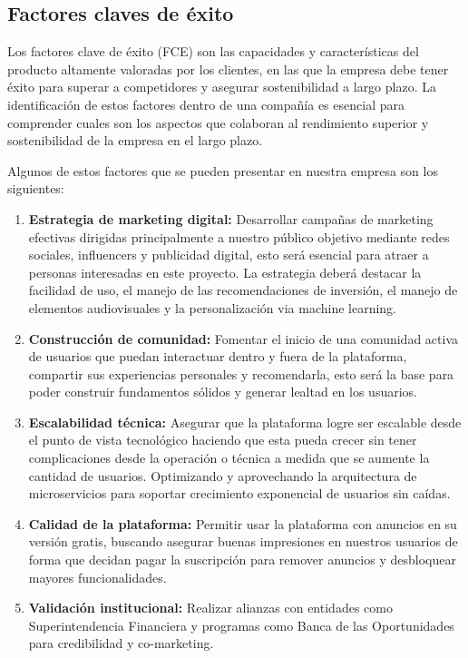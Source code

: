 \subsection*{Factores claves de éxito}

Los factores clave de éxito (FCE) son las capacidades y características del producto altamente valoradas por los clientes, en las que la empresa debe tener éxito para superar a competidores y asegurar sostenibilidad a largo plazo. La identificación de estos factores dentro de una compañía es esencial para comprender cuales son los aspectos que colaboran al rendimiento superior y sostenibilidad de la empresa en el largo plazo. 

Algunos de estos factores que se pueden presentar en nuestra empresa son los siguientes:

\begin{enumerate}
	\item \textbf{Estrategia de marketing digital:} Desarrollar campañas de marketing efectivas dirigidas principalmente a nuestro público objetivo mediante redes sociales, influencers y publicidad digital, esto será esencial para atraer a personas interesadas en este proyecto. La estrategia deberá destacar la facilidad de uso, el manejo de las recomendaciones de inversión, el manejo de elementos audiovisuales y la personalización via machine learning.
	
	\item \textbf{Construcción de comunidad:} Fomentar el inicio de una comunidad activa de usuarios que puedan interactuar dentro y fuera de la plataforma, compartir sus experiencias personales y recomendarla, esto será la base para poder construir fundamentos sólidos y generar lealtad en los usuarios.
	
	\item \textbf{Escalabilidad técnica:} Asegurar que la plataforma logre ser escalable desde el punto de vista tecnológico haciendo que esta pueda crecer sin tener complicaciones desde la operación o técnica a medida que se aumente la cantidad de usuarios. Optimizando y aprovechando la arquitectura de microservicios para soportar crecimiento exponencial de usuarios sin caídas.
	
	\item \textbf{Calidad de la plataforma:} Permitir usar la plataforma con anuncios en su versión gratis, buscando asegurar buenas impresiones en nuestros usuarios de forma que decidan pagar la suscripción para remover anuncios y desbloquear mayores funcionalidades.
	
	\item \textbf{Validación institucional:} Realizar alianzas con entidades como Superintendencia Financiera y programas como Banca de las Oportunidades para credibilidad y co-marketing.
\end{enumerate}

